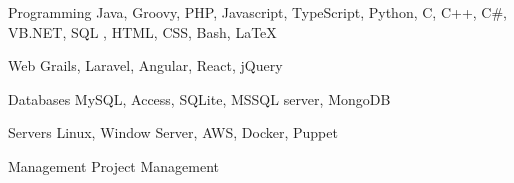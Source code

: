 
\begin{cvskills}

  \cvskill
    {Programming} %
    {Java, Groovy, PHP, Javascript, TypeScript, Python, C, C++, C\#, VB.NET, SQL , HTML, CSS, Bash, \LaTeX} %

  \cvskill
    {Web} %
    {Grails, Laravel, Angular, React, jQuery} %

  \cvskill
    {Databases} %
    {MySQL, Access, SQLite, MSSQL server, MongoDB} %

  \cvskill
    {Servers} %
    {Linux, Window Server, AWS, Docker, Puppet} %


  \cvskill
    {Management} %
    {Project Management} %


\end{cvskills}
